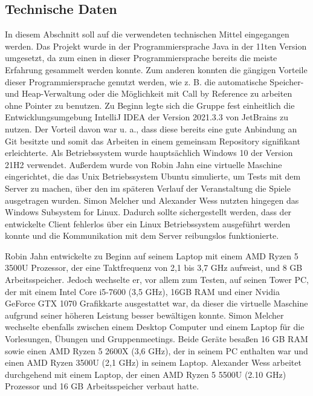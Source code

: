 \documentclass[12pt,a4paper,bibliography=totocnumbered,listof=totocnumbered]{article}
\begin{document}
\subsection{Technische Daten}
In diesem Abschnitt soll auf die verwendeten technischen Mittel eingegangen werden. Das Projekt wurde in der Programmiersprache Java in der 11ten Version umgesetzt, da zum einen in dieser Programmiersprache bereits die meiste Erfahrung gesammelt werden konnte. Zum anderen konnten die gängigen Vorteile dieser Programmiersprache genutzt werden, wie z. B. die automatische Speicher- und Heap-Verwaltung oder die Möglichkeit mit \glqq Call by Reference\grqq{} zu arbeiten ohne Pointer zu benutzen.
Zu Beginn legte sich die Gruppe fest einheitlich die Entwicklungsumgebung IntelliJ IDEA der Version 2021.3.3 von JetBrains zu nutzen. Der Vorteil davon war u. a., dass diese bereits eine gute Anbindung an Git besitzte und somit das Arbeiten in einem gemeinsam Repository signifikant erleichterte.
Als Betriebssystem wurde hauptsächlich Windows 10 der Version 21H2 verwendet. Außerdem wurde von Robin Jahn eine virtuelle Maschine eingerichtet, die das Unix Betriebssystem Ubuntu simulierte, um Tests mit dem Server zu machen, über den im späteren Verlauf der Veranstaltung die Spiele ausgetragen wurden. Simon Melcher und Alexander Wess nutzten hingegen das Windows Subsystem for Linux. Dadurch sollte sichergestellt werden, dass der entwickelte Client fehlerlos über ein Linux Betriebssystem ausgeführt werden konnte und die Kommunikation mit dem Server reibungslos funktionierte.

Robin Jahn entwickelte zu Beginn auf seinem Laptop mit einem AMD Ryzen 5 3500U Prozessor, der eine Taktfrequenz von 2,1 bis 3,7 GHz aufweist, und 8 GB Arbeitsspeicher. Jedoch wechselte er, vor allem zum Testen, auf seinen Tower PC, der mit einem Intel Core i5-7600 (3,5 GHz), 16GB RAM und einer Nvidia GeForce GTX 1070 Grafikkarte ausgestattet war, da dieser die virtuelle Maschine aufgrund seiner höheren Leistung besser bewältigen konnte. Simon Melcher wechselte ebenfalls zwischen einem Desktop Computer und einem Laptop für die Vorlesungen, Übungen und Gruppenmeetings. Beide Geräte besaßen 16 GB RAM sowie einen AMD Ryzen 5 2600X (3,6 GHz), der in seinem PC enthalten war und einen AMD Ryzen 3500U (2,1 GHz) in seinem Laptop. Alexander Wess arbeitet durchgehend mit einem Laptop, der einen AMD Ryzen 5 5500U (2.10 GHz) Prozessor und 16 GB Arbeitsspeicher verbaut hatte.

\newpage
\end{document}
